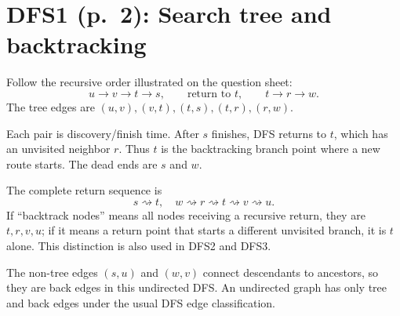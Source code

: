 \documentclass[11pt,a4paper]{article}
\newcommand{\question}[2]{\section*{#1: #2}}
\begin{document}
\newpage
\question{DFS1 (p.\ 2)}{Search tree and backtracking}
Follow the recursive order illustrated on the question sheet:
\[
u\to v\to t\to s,\qquad\text{return to }t,\qquad t\to r\to w.
\]
The tree edges are $(u,v),(v,t),(t,s),(t,r),(r,w)$.
\begin{center}\end{center}
Each pair is discovery/finish time. After $s$ finishes, DFS returns to $t$, which has an unvisited neighbor $r$. Thus $\boxed{t}$ is the backtracking branch point where a new route starts. The dead ends are $s$ and $w$.

The complete return sequence is
\[
s\rightsquigarrow t,\quad w\rightsquigarrow r\rightsquigarrow t\rightsquigarrow v\rightsquigarrow u.
\]
If ``backtrack nodes'' means all nodes receiving a recursive return, they are $t,r,v,u$; if it means a return point that starts a different unvisited branch, it is $t$ alone. This distinction is also used in DFS2 and DFS3.

The non-tree edges $(s,u)$ and $(w,v)$ connect descendants to ancestors, so they are back edges in this undirected DFS. An undirected graph has only tree and back edges under the usual DFS edge classification.
\end{document}

